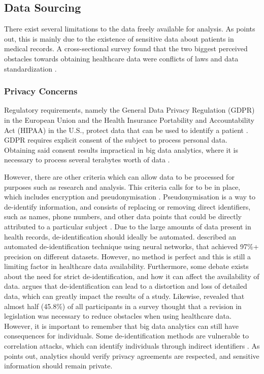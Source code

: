 \documentclass[a4paper,12pt]{article}
\begin{document}
\subsection{Data Sourcing}

There exist several limitations to the data freely available for analysis.
As \textcite[2]{Dalianis2015} points out, this is mainly due to the existence of sensitive data about patients in medical records.
A cross-sectional survey found that the two biggest perceived obstacles towards obtaining healthcare data were conflicts of laws and data standardization \parencite{Kim2019}.

\subsubsection{Privacy Concerns}

Regulatory requirements, namely the General Data Privacy Regulation (GDPR) in the European Union and the Health Insurance Portability and Accountability Act (HIPAA) in the U.S., protect data that can be used to identify a patient \parencite{Iyengar2018}.
GDPR requires explicit consent of the subject to process personal data. Obtaining said consent results impractical in big data analytics, where it is necessary to process several terabytes worth of data \parencite{Hintze2018}.

However, there are other criteria which can allow data to be processed for purposes such as research and analysis.
This criteria calls for  to be in place, which includes encryption and pseudonymisation \parencite[151]{Hintze2018}.
Pseudonymisation is a way to de-identify information, and consists of replacing or removing direct identifiers, such as names, phone numbers, and other data points that could be directly attributed to a particular subject \parencite[146-147]{Hintze2018}.
Due to the large amounts of data present in health records, de-identification should ideally be automated.
\textcite{Dernoncourt2016} described an automated de-identification technique using neural networks, that achieved 97\%+ precision on different datasets.
However, no method is perfect and this is still a limiting factor in healthcare data availability.
Furthermore, some debate exists about the need for strict de-identification, and how it can affect the availability of data.
\textcite[2]{Shin2018} argues that de-identification can lead to a distortion and loss of detailed data, which can greatly impact the results of a study.
Likewise, \textcite{Kim2019} revealed that almost half (45.8\%) of all participants in a survey thought that a revision in legislation was necessary to reduce obstacles when using healthcare data.
However, it is important to remember that big data analytics can still have consequences for individuals.
Some de-identification methods are vulnerable to correlation attacks, which can identify individuals through indirect identifiers \parencite{Abouelmehdi2018}.
As \textcite{Abouelmehdi2018} points out, analytics should verify privacy agreements are respected, and sensitive information should remain private.
\end{document}

